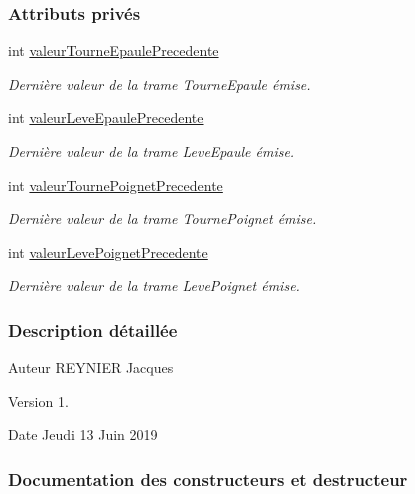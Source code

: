 \subsubsection*{Attributs privés}
\begin{DoxyCompactItemize}
\item 
int \hyperlink{class_bras_a7108c10b4e8f6ceb1ffb7543aeac55e1}{valeur\+Tourne\+Epaule\+Precedente}
\begin{DoxyCompactList}\small\item\em Dernière valeur de la trame Tourne\+Epaule émise. \end{DoxyCompactList}\item 
int \hyperlink{class_bras_ab9045906376dd797febdcb5956b155c1}{valeur\+Leve\+Epaule\+Precedente}
\begin{DoxyCompactList}\small\item\em Dernière valeur de la trame Leve\+Epaule émise. \end{DoxyCompactList}\item 
int \hyperlink{class_bras_aee3f364c582bb94e49be07f4f28c5ba4}{valeur\+Tourne\+Poignet\+Precedente}
\begin{DoxyCompactList}\small\item\em Dernière valeur de la trame Tourne\+Poignet émise. \end{DoxyCompactList}\item 
int \hyperlink{class_bras_a83bd1b995ba642e336c24151ba4964cf}{valeur\+Leve\+Poignet\+Precedente}
\begin{DoxyCompactList}\small\item\em Dernière valeur de la trame Leve\+Poignet émise. \end{DoxyCompactList}\end{DoxyCompactItemize}


\subsubsection{Description détaillée}
\begin{DoxyAuthor}{Auteur}
R\+E\+Y\+N\+I\+ER Jacques
\end{DoxyAuthor}
\begin{DoxyVersion}{Version}
1.
\end{DoxyVersion}
\begin{DoxyDate}{Date}
Jeudi 13 Juin 2019 
\end{DoxyDate}


\subsubsection{Documentation des constructeurs et destructeur}
\mbox{\label{class_bras_aa194e94737e1e024e7f9a0cd6ecb6594}} 
